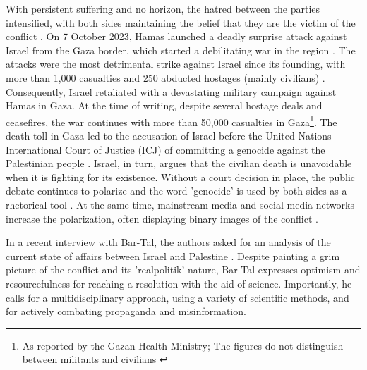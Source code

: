 \documentclass[dissertation,math,vertlayout,pdfa,colorlinks]{aaltoseries}
\begin{document}
With persistent suffering and no horizon, the hatred between the parties intensified, with both sides maintaining the belief that they are the victim of the conflict \cite{leshemSocietalBeliefsCollective2022}. On 7 October 2023, Hamas launched a deadly surprise attack against Israel from the Gaza border, which started a debilitating war in the region \cite{bymanWarTheyBoth2024}. The attacks were the most detrimental strike against Israel since its founding, with more than 1,000 casualties and 250 abducted hostages (mainly civilians) \cite{flamerAsymmetricBattleWits2025}. Consequently, Israel retaliated with a devastating military campaign against Hamas in Gaza. At the time of writing, despite several hostage deals and ceasefires, the war continues with more than 50,000 casualties in Gaza\footnote{As reported by the Gazan Health Ministry; The figures do not distinguish between militants and civilians  \cite{kershnerIsraelExpandsGaza2025}}. The death toll in Gaza led to the accusation of Israel before the United Nations International Court of Justice (ICJ) of committing a genocide against the Palestinian people \cite{atadjanovGenocideCaseIsrael2024}. Israel, in turn, argues that the civilian death is unavoidable when it is fighting for its existence. Without a court decision in place, the public debate continues to polarize and the word 'genocide' is used by both sides as a rhetorical tool \cite{jamesItGenocideGaza2025}. At the same time, mainstream media and social media networks increase the polarization, often displaying binary images of the conflict \cite{osimenMisconstructionEnemyImages2023}.

In a recent interview with Bar-Tal, the authors asked for an analysis of the current state of affairs between Israel and Palestine \cite{bar-talDanielBartalIsraelipalestinian2024}. Despite painting a grim picture of the conflict and its 'realpolitik' nature, Bar-Tal expresses optimism and resourcefulness for reaching a resolution with the aid of science. Importantly, he calls for a multidisciplinary approach, using a variety of scientific methods, and for actively combating propaganda and misinformation.
\end{document}
